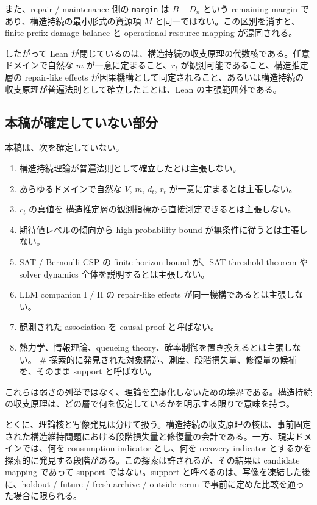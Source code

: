 \documentclass[12pt,a4paper]{article}
\begin{document}
また、repair / maintenance 側の \texttt{margin} は \(B-D_{n}\) という remaining margin であり、構造持続の最小形式の資源項 \(M\) と同一ではない。この区別を消すと、finite-prefix damage balance と operational resource mapping が混同される。

したがって Lean が閉じているのは、構造持続の収支原理の代数核である。任意ドメインで自然な \(m\) が一意に定まること、\(r_{t}\) が観測可能であること、構造推定層の repair-like effects が因果機構として同定されること、あるいは構造持続の収支原理が普遍法則として確立したことは、Lean の主張範囲外である。

\subsection{本稿が確定していない部分}\label{ux672cux7a3fux304cux78baux5b9aux3057ux3066ux3044ux306aux3044ux90e8ux5206}

本稿は、次を確定していない。

\begin{enumerate}
\def\labelenumi{\arabic{enumi}.}
\tightlist
\item
  構造持続理論が普遍法則として確立したとは主張しない。
\item
  あらゆるドメインで自然な \(V\), \(m\), \(d_{t}\), \(r_{t}\) が一意に定まるとは主張しない。
\item
  \(r_{t}\) の真値を 構造推定層の観測指標から直接測定できるとは主張しない。
\item
  期待値レベルの傾向から high-probability bound が無条件に従うとは主張しない。
\item
  SAT / Bernoulli-CSP の finite-horizon bound が、SAT threshold theorem や solver dynamics 全体を説明するとは主張しない。
\item
  LLM companion I / II の repair-like effects が同一機構であるとは主張しない。
\item
  観測された association を causal proof と呼ばない。
\item
  熱力学、情報理論、queueing theory、確率制御を置き換えるとは主張しない。 \# 探索的に発見された対象構造、測度、段階損失量、修復量の候補を、そのまま support と呼ばない。
\end{enumerate}

これらは弱さの列挙ではなく、理論を空虚化しないための境界である。構造持続の収支原理は、どの層で何を仮定しているかを明示する限りで意味を持つ。

とくに、理論核と写像発見は分けて扱う。構造持続の収支原理の核は、事前固定された構造維持問題における段階損失量と修復量の会計である。一方、現実ドメインでは、何を consumption indicator とし、何を recovery indicator とするかを探索的に発見する段階がある。この探索は許されるが、その結果は candidate mapping であって support ではない。support と呼べるのは、写像を凍結した後に、holdout / future / fresh archive / outside rerun で事前に定めた比較を通った場合に限られる。
\end{document}
